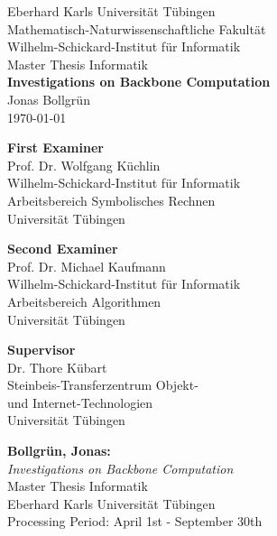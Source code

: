 \begin{titlepage}
 \begin{center}
  {\LARGE Eberhard Karls Universität Tübingen}\\
  {\large Mathematisch-Naturwissenschaftliche Fakultät \\
Wilhelm-Schickard-Institut für Informatik\\[3.0cm]}
  {\huge Master Thesis Informatik\\[2.5cm]}
  {\Large\bf  Investigations on Backbone Computation\\[1.5cm]}
 {\large Jonas Bollgrün}\\[0.5cm]
	\today \\[4.0cm]

\begin{multicols}{2}
\begin{center}{
\small\bf First Examiner}\\[0.2cm]
{\large Prof. Dr. Wolfgang Küchlin}\\
  {\footnotesize Wilhelm-Schickard-Institut für Informatik\\Arbeitsbereich Symbolisches Rechnen\\
	Universität Tübingen}	
\end{center}
\begin{center}{
\small\bf Second Examiner}\\[0.2cm]
{\large Prof. Dr. Michael Kaufmann}\\
  {\footnotesize Wilhelm-Schickard-Institut für Informatik\\Arbeitsbereich Algorithmen\\
	Universität Tübingen}	
\end{center}
	
\end{multicols}

\begin{center}
{\small\bf Supervisor}\\[0.2cm]
{\large Dr. Thore Kübart}\\
  {  \footnotesize Steinbeis-Transferzentrum Objekt-\\und Internet-Technologien\\Universität Tübingen}
  \end{center}
	
  \end{center}
\end{titlepage}




\thispagestyle{empty}
\vspace*{\fill}
\begin{minipage}{11.2cm}
\textbf{Bollgrün, Jonas:}\\
\emph{Investigations on Backbone Computation}\\
Master Thesis Informatik\\
Eberhard Karls Universität Tübingen\\
Processing Period: April 1st - September 30th
\end{minipage}
\newpage